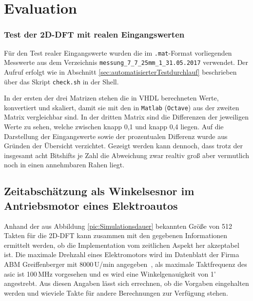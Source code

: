   
 
 
 






  
 \chapter{Evaluation}
 





 \subsection{Test der 2D-DFT mit realen Eingangswerten}
 
 Für den Test realer Eingangswerte wurden die im \texttt{.mat}-Format vorliegenden Messwerte aus dem Verzeichnis \texttt{messung\_7\_7\_25mm\_1\_31.05.2017} verwendet.
 Der Aufruf erfolgt wie in Abschnitt \ref{sec:automatisierterTestdurchlauf} beschrieben über das Skript \texttt{check.sh} in der Shell.
 
 
 

In der ersten der drei Matrizen stehen die in VHDL berechneten Werte, konvertiert und skaliert, damit sie mit den in \texttt{Matlab} (\texttt{Octave}) aus der zweiten 
Matrix vergleichbar sind. In der dritten Matrix sind die Differenzen der jeweiligen Werte zu sehen, welche zwischen knapp 0,1 und knapp 0,4 liegen. 
Auf die Darstellung der Eingangswerte sowie der prozentualen Differenz wurde aus Gründen der Übersicht verzichtet. 
Gezeigt werden kann dennoch, dass trotz der insgesamt acht Bitshifts je Zahl die Abweichung zwar realtiv groß aber vermutlich noch in einen annehmbaren Rahen liegt.
 
 
 \section{Zeitabschätzung als Winkelsesnor im Antriebsmotor eines Elektroautos}
 Anhand der aus Abbildung \ref{pic:Simulationsdauer} bekannten Größe von 512 Takten für die 2D-DFT kann zusammen mit den gegebenen Informationen
 ermittelt werden, ob die Implementation vom zeitlichen 
 Aspekt her akzeptabel ist.
 Die maximale Drehzahl eines Elektromotors wird im Datenblatt der Firma ABM Greiffenberger mit 8000\,U/min angegeben~\autocite[5]{greiffenberger},
 als maximale Taktfrequenz des \gls{asic} ist 100\,MHz vorgesehen und es wird eine Winkelgenauigkeit von 1${}^\circ$ angestrebt.
 Aus diesen Angaben lässt sich errechnen, ob die Vorgaben eingehalten werden und wieviele Takte für andere Berechnungen zur Verfügung stehen.
 
